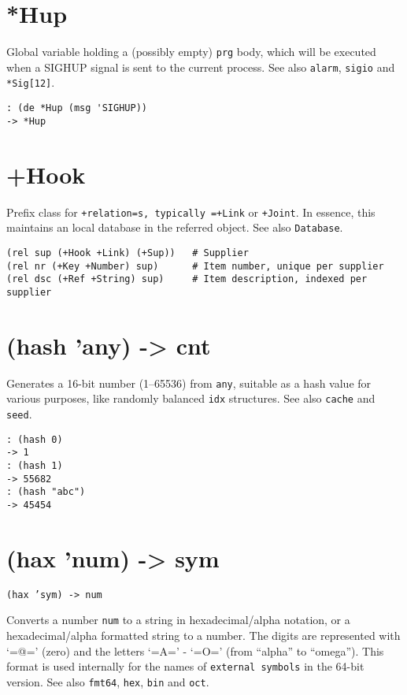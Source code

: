 {{{{{{ 
\section{*Hup}
\label{sec-8-1-8-1}


Global variable holding a (possibly empty) \texttt{prg} body, which will be
executed when a SIGHUP signal is sent to the current process. See also
\texttt{alarm}, \texttt{sigio} and \texttt{*Sig[12]}.


\begin{verbatim}
: (de *Hup (msg 'SIGHUP))
-> *Hup
\end{verbatim}

 
\section{+Hook}
\label{sec-8-1-8-2}


Prefix class for \texttt{+relation=s, typically =+Link} or \texttt{+Joint}. In
essence, this maintains an local database in the referred object. See
also \texttt{Database}.


\begin{verbatim}
(rel sup (+Hook +Link) (+Sup))   # Supplier
(rel nr (+Key +Number) sup)      # Item number, unique per supplier
(rel dsc (+Ref +String) sup)     # Item description, indexed per supplier
\end{verbatim}

 
\section{(hash 'any) -> cnt}
\label{sec-8-1-8-3}


Generates a 16-bit number (1--65536) from \texttt{any}, suitable as a hash
value for various purposes, like randomly balanced \texttt{idx} structures. See
also \texttt{cache} and \texttt{seed}.


\begin{verbatim}
: (hash 0)
-> 1
: (hash 1)
-> 55682
: (hash "abc")
-> 45454
\end{verbatim}

 
\section{(hax 'num) -> sym}
\label{sec-8-1-8-4}


\texttt{(hax 'sym) -> num}

Converts a number \texttt{num} to a string in hexadecimal/alpha notation, or a
hexadecimal/alpha formatted string to a number. The digits are
represented with `=@=' (zero) and the letters `=A=' - `=O=' (from
``alpha'' to ``omega''). This format is used internally for the names of
\texttt{external symbols} in the 64-bit version. See also \texttt{fmt64}, \texttt{hex}, \texttt{bin}
and \texttt{oct}.


}}}}}}
